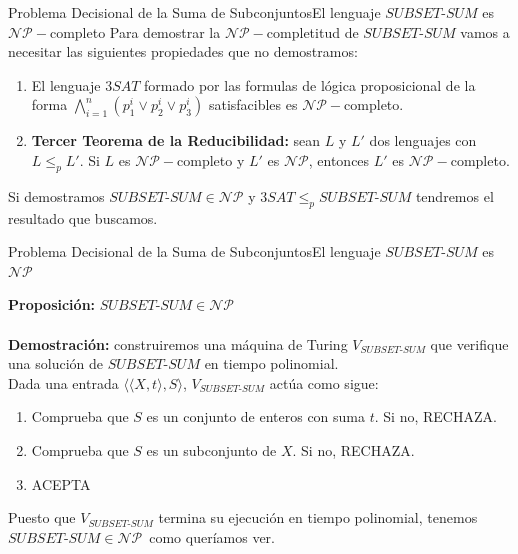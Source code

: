 \documentclass[10pt, envcountsect, presentation, aspectratio=169]{beamer}
\newcommand{\ssum}{\ensuremath{SUBSET\text{-}SUM}}
\begin{document}
\begin{frame}{Problema Decisional de la Suma de Subconjuntos}{El lenguaje $\ssum$ es $\mathcal{NP}-$completo}
    Para demostrar la $\mathcal{NP}-$completitud de $\ssum$ vamos a necesitar las siguientes propiedades que no demostramos:
    \begin{enumerate}[1]
        \item El lenguaje $3SAT$ formado por las formulas de lógica proposicional de la forma $\bigwedge_{i=1}^n(p_1^i \vee p_2^i \vee p_3^i)$ satisfacibles es $\mathcal{NP}-$completo.
        \item \textbf{Tercer Teorema de la Reducibilidad:} sean $L$ y $L'$ dos lenguajes con $L \leq_p L'$. Si $L$ es $\mathcal{NP}-$completo y $L'$ es $\mathcal{NP}$, entonces $L'$ es $\mathcal{NP}-$completo. 
    \end{enumerate}
    Si demostramos $\ssum \in \mathcal{NP}$ y $3SAT \leq_p \ssum$ tendremos el resultado que buscamos. 
\end{frame}

\begin{frame}{Problema Decisional de la Suma de Subconjuntos}{El lenguaje $\ssum$ es $\mathcal{NP}$}

    \textbf{Proposición:} $\ssum \in \mathcal{NP}$\\~\\
    \textbf{Demostración:} construiremos una máquina de Turing $V_{\ssum}$ que verifique una solución de $\ssum$ en tiempo polinomial.\\
    Dada una entrada $\langle \langle X, t\rangle, S\rangle$, $V_{\ssum}$ actúa como sigue:
    \begin{enumerate}
        \item Comprueba que $S$ es un conjunto de enteros con suma $t$. Si no, RECHAZA.
        \item Comprueba que $S$ es un subconjunto de $X$. Si no, RECHAZA.
        \item ACEPTA
    \end{enumerate}
    Puesto que $V_{\ssum}$ termina su ejecución en tiempo polinomial, tenemos $\ssum \in \mathcal{NP}$\, como queríamos ver.
\end{frame}
\end{document}
